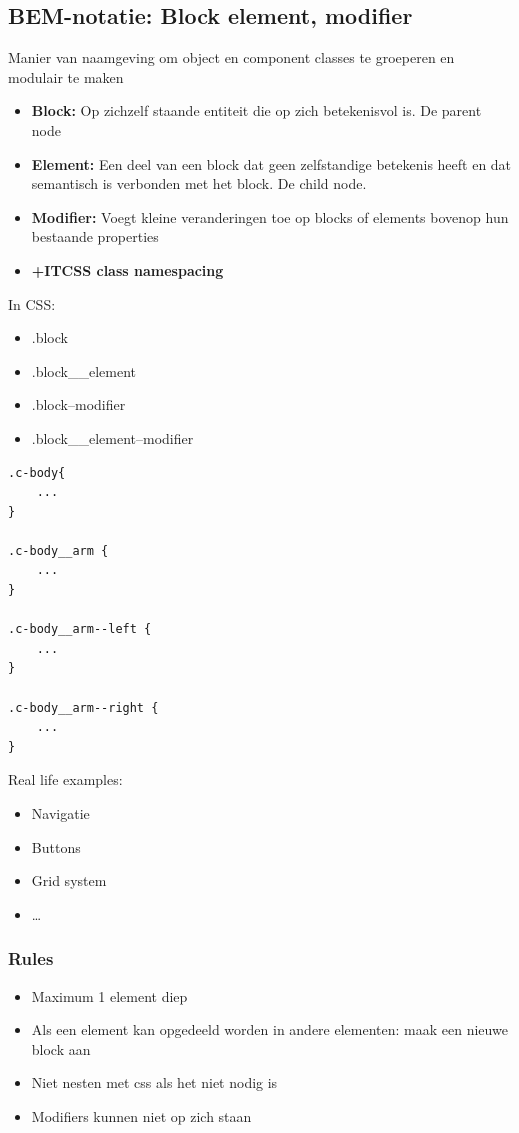 \documentclass{article}
\newcommand{\bold}[1]{\textbf{#1}}
\begin{document}
\subsection{BEM-notatie: Block element, modifier}
Manier van naamgeving om object en component classes te groeperen en modulair te maken
\begin{itemize}
    \item \bold{Block:} Op zichzelf staande entiteit die op zich betekenisvol is. De parent node
    \item \bold{Element:} Een deel van een block dat geen zelfstandige betekenis heeft en dat semantisch is verbonden met het block. De child node.
    \item \bold{Modifier:} Voegt kleine veranderingen toe op blocks of elements bovenop hun bestaande properties
    \item \bold{+ITCSS class namespacing}
\end{itemize}

In CSS:
\begin{itemize}
    \item .block
    \item .block\_\_element
    \item .block--modifier
    \item .block\_\_element--modifier
\end{itemize}

\begin{lstlisting}
.c-body{
    ...
}

.c-body__arm {
    ...
}

.c-body__arm--left {
    ...
}

.c-body__arm--right {
    ...
}
\end{lstlisting}

Real life examples:
\begin{itemize}
    \item Navigatie
    \item Buttons
    \item Grid system
    \item \dots
\end{itemize}

\subsubsection{Rules}
\begin{itemize}
    \item Maximum 1 element diep
    \item Als een element kan opgedeeld worden in andere elementen: maak een nieuwe block aan
    \item Niet nesten met css als het niet nodig is
    \item Modifiers kunnen niet op zich staan
\end{itemize}
\end{document}
